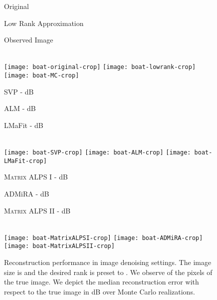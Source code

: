 \documentclass[twocolumn]{svjour3}
\begin{document}
\begin{figure*}[!htp]
\centering
\begin{minipage}{0.28\linewidth}
\centering \normalsize{Original}
\end{minipage} 
\begin{minipage}{0.28\linewidth}
\centering \normalsize{Low Rank Approximation}
\end{minipage}
\begin{minipage}{0.28\linewidth}
\centering \normalsize{Observed Image}
\end{minipage} \vspace{0.1cm}\\

\texttt{[image: boat-original-crop]} 
\texttt{[image: boat-lowrank-crop]} 
\texttt{[image: boat-MC-crop]}\\

\centering
\begin{minipage}{0.28\linewidth}
\centering \normalsize{SVP -  dB}
\end{minipage} 
\begin{minipage}{0.28\linewidth}
\centering \normalsize{ALM -  dB}
\end{minipage}
\begin{minipage}{0.28\linewidth}
\centering \normalsize{LMaFit -  dB}
\end{minipage} \vspace{0.1cm}\\

\texttt{[image: boat-SVP-crop]} 
\texttt{[image: boat-ALM-crop]} 
\texttt{[image: boat-LMaFit-crop]} \\

\centering
\begin{minipage}{0.28\linewidth}
\centering \normalsize{\textsc{\textsc{Matrix ALPS I}} -  dB}
\end{minipage} 
\begin{minipage}{0.28\linewidth}
\centering \normalsize{ADMiRA -  dB}
\end{minipage}
\begin{minipage}{0.28\linewidth}
\centering \normalsize{\textsc{\textsc{Matrix ALPS II}} -  dB}
\end{minipage} \vspace{0.1cm}\\

\texttt{[image: boat-MatrixALPSI-crop]} 
\texttt{[image: boat-ADMiRA-crop]} 
\texttt{[image: boat-MatrixALPSII-crop]}\\
\caption{\small{Reconstruction performance in image denoising settings. The image size is  and the desired rank is preset to . We observe  of the pixels of the true image. We depict the median reconstruction error with respect to the true image in dB over  Monte Carlo realizations.}} {\label{fig:real1}}
\end{figure*}
\end{document}
